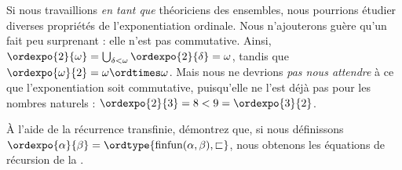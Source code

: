 \documentclass[../../../include/open-logic-section]{subfiles}
\begin{document}
Si nous travaillions \emph{en tant que} théoriciens
des ensembles, nous pourrions étudier diverses
propriétés de l'exponentiation ordinale. Nous
n'ajouterons guère qu'un fait peu surprenant :
elle n'est pas commutative. Ainsi,
$\ordexpo{2}{\omega} =
\bigcup_{\delta < \omega}\ordexpo{2}{\delta}
= \omega$, tandis que
$\ordexpo{\omega}{2} = \omega \ordtimes \omega$.
Mais nous ne devrions \emph{pas nous attendre}
à ce que l'exponentiation soit commutative,
puisqu'elle ne l'est déjà pas pour les nombres
naturels :
$\ordexpo{2}{3} = 8 < 9 = \ordexpo{3}{2}$.

\begin{prob}
À l'aide de la récurrence transfinie, démontrez
que, si nous définissons
$\ordexpo{\alpha}{\beta} =
\ordtype{\text{finfun}(\alpha, \beta),
\sqsubset}$, nous obtenons les équations
de récursion de la
.
\end{prob}
\end{document}
